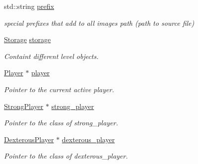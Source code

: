 \begin{DoxyCompactItemize}
\mbox{\label{class_level_a08f8815ed6a37bb8b1a2c045946cdd68}} 
std\+::string \hyperlink{class_level_a08f8815ed6a37bb8b1a2c045946cdd68}{prefix}
\begin{DoxyCompactList}\small\item\em special prefixes that add to all images path (path to source file) \end{DoxyCompactList}\item 
\mbox{\label{class_level_af137cabe605aaef11c8e388d80924314}} 
\hyperlink{class_storage}{Storage} \hyperlink{class_level_af137cabe605aaef11c8e388d80924314}{storage}
\begin{DoxyCompactList}\small\item\em Containt different level objects. \end{DoxyCompactList}\item 
\mbox{\label{class_level_a76b010ccc524cef1ae0c3adc2a63d3b1}} 
\hyperlink{class_player}{Player} $\ast$ \hyperlink{class_level_a76b010ccc524cef1ae0c3adc2a63d3b1}{player}
\begin{DoxyCompactList}\small\item\em Pointer to the current active player. \end{DoxyCompactList}\item 
\mbox{\label{class_level_a25923eb853764ea106f714dc5fe8cf94}} 
\hyperlink{class_strong_player}{Strong\+Player} $\ast$ \hyperlink{class_level_a25923eb853764ea106f714dc5fe8cf94}{strong\+\_\+player}
\begin{DoxyCompactList}\small\item\em Pointer to the class of strong\+\_\+player. \end{DoxyCompactList}\item 
\mbox{\label{class_level_afb99ff2b6c3eee226c8c6703733071fa}} 
\hyperlink{class_dexterous_player}{Dexterous\+Player} $\ast$ \hyperlink{class_level_afb99ff2b6c3eee226c8c6703733071fa}{dexterous\+\_\+player}
\begin{DoxyCompactList}\small\item\em Pointer to the class of dexterous\+\_\+player. \end{DoxyCompactList}\item 
\mbox{\label{class_level_ab71a19e06640f896110d22af9142b856}} 

\end{DoxyCompactItemize}

